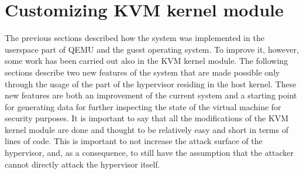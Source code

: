 \section{Customizing KVM kernel module}
The previous sections described how the system was implemented in the userspace part of QEMU and the guest operating system. To improve it, however, some work has been carried out also in the KVM kernel module. The following sections describe two new features of the system that are made possible only through the usage of the part of the hypervisor residing in the host kernel. These new features are both an improvement of the current system and a starting point for generating data for further inspecting the state of the virtual machine for security purposes. It is important to say that all the modifications of the KVM kernel module are done and thought to be relatively easy and short in terms of lines of code. This is important to not increase the attack surface of the hypervisor, and, as a consequence, to still have the assumption that the attacker cannot  directly attack the hypervisor itself.

